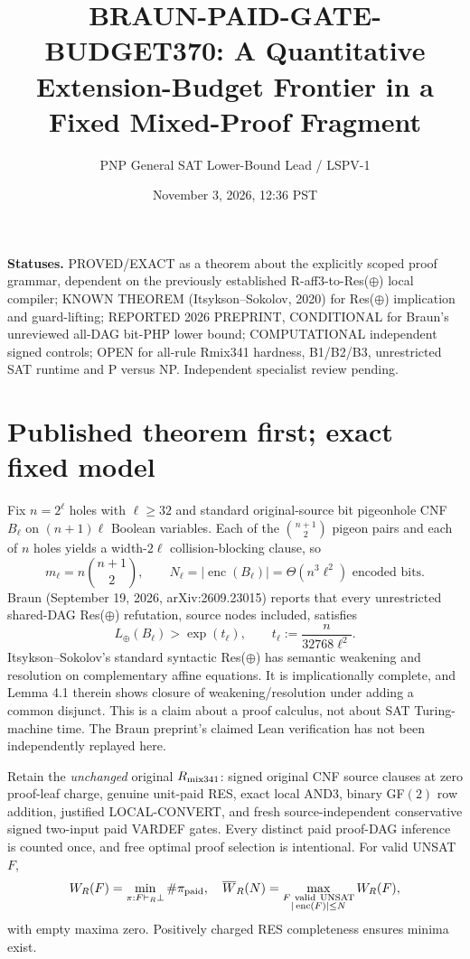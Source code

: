 \documentclass[11pt]{article}
\title{BRAUN-PAID-GATE-BUDGET370: A Quantitative Extension-Budget Frontier in a Fixed Mixed-Proof Fragment}
\author{PNP General SAT Lower-Bound Lead / LSPV-1}
\date{November 3, 2026, 12:36 PST}
\begin{document}
\maketitle
\noindent\textbf{Statuses.} PROVED/EXACT as a theorem about the explicitly scoped proof grammar, dependent on the previously established R-aff3-to-Res($\oplus$) local compiler; KNOWN THEOREM (Itsykson--Sokolov, 2020) for Res($\oplus$) implication and guard-lifting; REPORTED 2026 PREPRINT, CONDITIONAL for Braun's unreviewed all-DAG bit-PHP lower bound; COMPUTATIONAL independent signed controls; OPEN for all-rule Rmix341 hardness, B1/B2/B3, unrestricted SAT runtime and P versus NP. Independent specialist review pending.

\section*{Published theorem first; exact fixed model}
Fix $n=2^\ell$ holes with $\ell\ge32$ and standard original-source bit pigeonhole CNF $B_\ell$ on $(n+1)\ell$ Boolean variables. Each of the $\binom{n+1}{2}$ pigeon pairs and each of $n$ holes yields a width-$2\ell$ collision-blocking clause, so
\[
 m_\ell=n\binom{n+1}{2},\qquad N_\ell=|\operatorname{enc}(B_\ell)|=\Theta(n^3\ell^2)\text{ encoded bits}.
\]
Braun (September 19, 2026, arXiv:2609.23015) reports that every unrestricted shared-DAG Res($\oplus$) refutation, source nodes included, satisfies
\[
L_{\oplus}(B_\ell)>\exp(t_\ell),\qquad t_\ell:=\frac{n}{32768\ell^2}. \tag{1}
\]
Itsykson--Sokolov's standard syntactic Res($\oplus$) has semantic weakening and resolution on complementary affine equations. It is implicationally complete, and Lemma 4.1 therein shows closure of weakening/resolution under adding a common disjunct. This is a claim about a proof calculus, not about SAT Turing-machine time. The Braun preprint's claimed Lean verification has not been independently replayed here.

Retain the \emph{unchanged} original $R_{\rm mix341}$: signed original CNF source clauses at zero proof-leaf charge, genuine unit-paid RES, exact local AND3, binary GF$(2)$ row addition, justified LOCAL-CONVERT, and fresh source-independent conservative signed two-input paid VARDEF gates. Every distinct paid proof-DAG inference is counted once, and free optimal proof selection is intentional. For valid UNSAT $F$,
\[
 W_R(F)=\min_{\pi:F\vdash_R\bot}\#\pi_{\rm paid},\quad
 \overline W_R(N)=\max_{\substack{F\ \mathrm{valid\ UNSAT}\\|\operatorname{enc}(F)|\le N}}W_R(F),
\]
with empty maxima zero. Positively charged RES completeness ensures minima exist.
\end{document}
